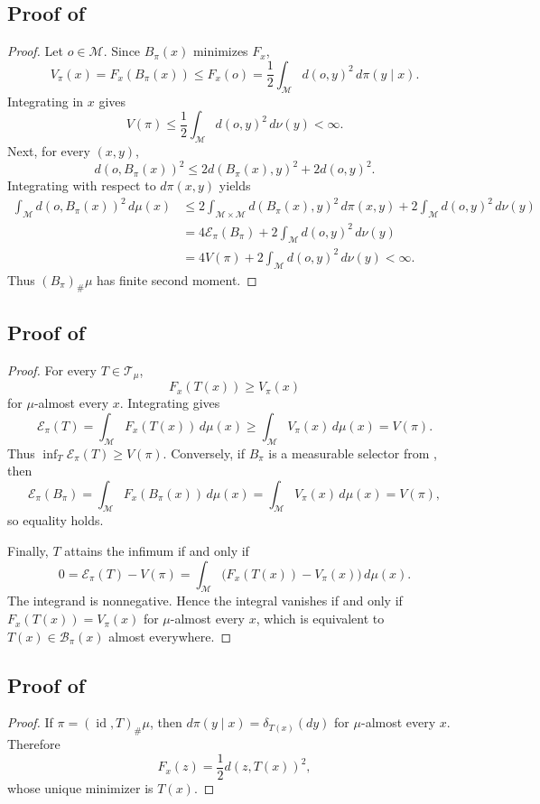 \documentclass[10pt]{article} %
\theoremstyle{definition}
\providecommand{\1}{\mathbf{1}}
\providecommand{\sM}{\mathcal{M}}
\DeclareMathOperator{\id}{id}
\begin{document}
\subsection{Proof of }
\begin{proof}
Let $o\in\sM$. Since $B_\pi(x)$ minimizes $F_x$,
\[
V_\pi(x)=F_x(B_\pi(x))\le F_x(o)=\frac12\int_{\sM} d(o,y)^2\,d\pi(y\mid x).
\]
Integrating in $x$ gives
\[
V(\pi)\le \frac12\int_{\sM} d(o,y)^2\,d\nu(y)<\infty.
\]
Next, for every $(x,y)$,
\[
d(o,B_\pi(x))^2\le 2d(B_\pi(x),y)^2+2d(o,y)^2.
\]
Integrating with respect to $d\pi(x,y)$ yields
\begin{align*}
\int_{\sM} d(o,B_\pi(x))^2\,d\mu(x)
&\le 2\int_{\sM\times\sM}d(B_\pi(x),y)^2\,d\pi(x,y)
   +2\int_{\sM} d(o,y)^2\,d\nu(y)\\
&=4\mathcal E_\pi(B_\pi)+2\int_{\sM} d(o,y)^2\,d\nu(y)\\
&=4V(\pi)+2\int_{\sM} d(o,y)^2\,d\nu(y)<\infty.
\end{align*}
Thus $(B_\pi)_\#\mu$ has finite second moment.
\end{proof}

\subsection{Proof of }
\begin{proof}
For every $T\in\mathcal T_\mu$,
\[
F_x(T(x))\ge V_\pi(x)
\]
for $\mu$-almost every $x$. Integrating gives
\[
\mathcal E_\pi(T)=\int_{\sM} F_x(T(x))\,d\mu(x)
\ge \int_{\sM} V_\pi(x)\,d\mu(x)=V(\pi).
\]
Thus $\inf_T\mathcal E_\pi(T)\ge V(\pi)$. Conversely, if $B_\pi$ is a measurable selector from , then
\[
\mathcal E_\pi(B_\pi)=\int_{\sM} F_x(B_\pi(x))\,d\mu(x)=\int_{\sM} V_\pi(x)\,d\mu(x)=V(\pi),
\]
so equality holds.

Finally, $T$ attains the infimum if and only if
\[
0=\mathcal E_\pi(T)-V(\pi)
=\int_{\sM}\bigl(F_x(T(x))-V_\pi(x)\bigr)\,d\mu(x).
\]
The integrand is nonnegative. Hence the integral vanishes if and only if $F_x(T(x))=V_\pi(x)$ for $\mu$-almost every $x$, which is equivalent to $T(x)\in\mathcal B_\pi(x)$ almost everywhere.
\end{proof}



\subsection{Proof of }
\begin{proof}
If $\pi=(\id,T)_\#\mu$, then $d\pi(y\mid x)=\delta_{T(x)}(dy)$ for $\mu$-almost every $x$. Therefore
\[
F_x(z)=\frac12 d(z,T(x))^2,
\]
whose unique minimizer is $T(x)$.
\end{proof}
\end{document}
